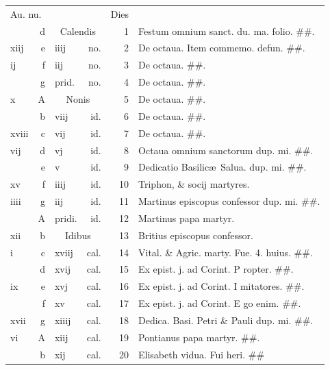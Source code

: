 \documentclass[a5paper,10pt]{book}
\def\ae{æ}
\begin{document}
\begin{center}
\begin{tabular}{l r l r r l}
\multicolumn{2}{l}{\color{red}Au. nu.} & & & \color{red} Dies & \\
 & d & \multicolumn{2}{c}{\color{red} Calendis} & 1 & \color{red} Festum omnium sanct. du. ma. \color{black} folio. \#\#.\\
xiij & e & iiij & no. & 2 & De octaua. \color{red} Item commemo. defun. \color{black} \#\#.\\
ij & f & iij & no. & 3 & De octaua. \#\#.\\
 & g & \color{red} prid. & no. & 4 & De octaua. \color{black} \#\#.\\
x & \color{red} A & \multicolumn{2}{c}{\color{red} Nonis} & 5 & De octaua. \#\#.\\
 & b & viij & id. & 6 & De octaua. \#\#.\\
xviii & c & vij & id. & 7 & De octaua. \color{black} \#\#.\\
vij & d & vj & id. & 8 & Octaua omnium sanctorum dup. mi. \#\#.\\
 & e & v & id. & 9 & Dedicatio Basilic\ae \ Salua. dup. mi. \color{black} \#\#.\\
xv & f & iiij & id. & 10 & Triphon, \& socij martyres. \\%
iiii & g & iij & id. & 11 & \color{red} Martinus episcopus confessor dup. mi. \color{black} \#\#.\\
 & \color{red} A & \color{red} pridi. & id. & 12 & Martinus papa martyr. \\
xii & b & \multicolumn{2}{c}{\color{red} Idibus} & 13 & Britius episcopus confessor. \\
i & c & xviij & cal. & 14 & Vital. \& Agric. marty. \color{red} Fue. 4. huius. \color{black} \#\#.\\
 & d & xvij & cal. & 15 & Ex epist. j. ad Corint. \color{red} P\color{black} ropter. \#\#.\\
ix & e & xvj & cal. & 16 & Ex epist. j. ad Corint. \color{red} I\color{black} mitatores. \#\#.\\
 & f & xv & cal. & 17 & Ex epist. j. ad Corint. \color{red} E\color{black} go enim. \#\#.\\
xvii & g & xiiij & cal. & 18 & Dedica. Basi. Petri \& Pauli dup. mi. \#\#.\\
vi & \color{red} A & xiij & cal. & 19 & Pontianus papa martyr. \#\#.\\
 & b & xij & cal. & 20 & Elisabeth vidua. \color{red} Fui heri. \color{black} \#\#\\

\end{tabular}
\end{center}
\end{document}
